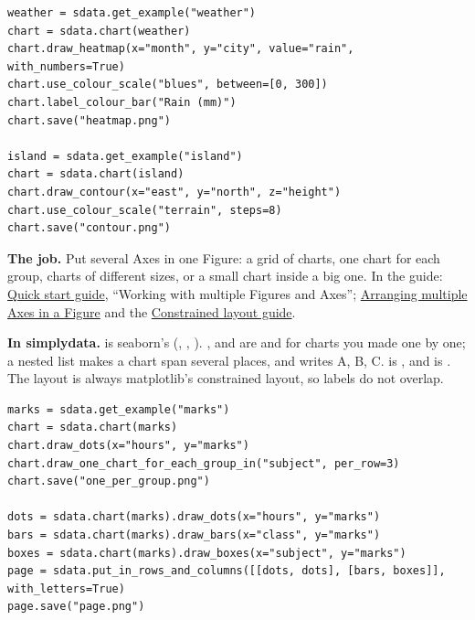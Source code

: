 \begin{lstlisting}[style=py]
weather = sdata.get_example("weather")
chart = sdata.chart(weather)
chart.draw_heatmap(x="month", y="city", value="rain", with_numbers=True)
chart.use_colour_scale("blues", between=[0, 300])
chart.label_colour_bar("Rain (mm)")
chart.save("heatmap.png")

island = sdata.get_example("island")
chart = sdata.chart(island)
chart.draw_contour(x="east", y="north", z="height")
chart.use_colour_scale("terrain", steps=8)
chart.save("contour.png")
\end{lstlisting}


\textbf{The job.} Put several Axes in one Figure: a grid of charts, one chart for each group, charts of
different sizes, or a small chart inside a big one. In the guide:
\href{https://matplotlib.org/stable/users/explain/quick_start.html}{Quick start guide}, ``Working
with multiple Figures and Axes'';
\href{https://matplotlib.org/stable/users/explain/axes/arranging_axes.html}{Arranging multiple Axes in
a Figure} and the
\href{https://matplotlib.org/stable/users/explain/axes/constrainedlayout_guide.html}{Constrained layout
guide}.

\textbf{In simplydata.}  is seaborn's
 (, , ). ,
 and  are
 and  for charts you made one by one; a nested list makes
a chart span several places, and  writes A, B, C.  is
, and  is . The layout is always
matplotlib's constrained layout, so labels do not overlap.

\begin{lstlisting}[style=py]
marks = sdata.get_example("marks")
chart = sdata.chart(marks)
chart.draw_dots(x="hours", y="marks")
chart.draw_one_chart_for_each_group_in("subject", per_row=3)
chart.save("one_per_group.png")

dots = sdata.chart(marks).draw_dots(x="hours", y="marks")
bars = sdata.chart(marks).draw_bars(x="class", y="marks")
boxes = sdata.chart(marks).draw_boxes(x="subject", y="marks")
page = sdata.put_in_rows_and_columns([[dots, dots], [bars, boxes]], with_letters=True)
page.save("page.png")
\end{lstlisting}

